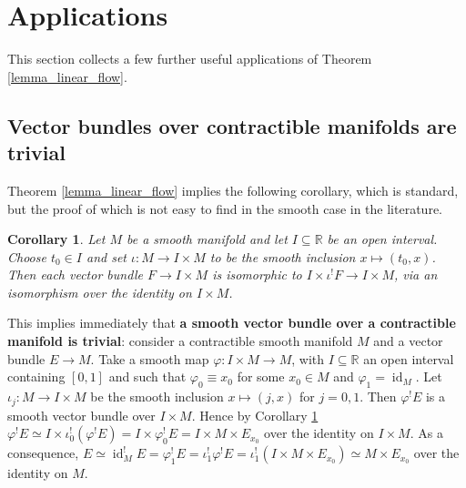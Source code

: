 \documentclass{amsart}
\theoremstyle{plain}
\newtheorem{corollary}[theorem]{Corollary}
\DeclareMathOperator {\id}    {id}
\begin{document}
\section{Applications}
This section collects a few further  useful applications of Theorem \ref{lemma_linear_flow}.
\subsection{Vector bundles over contractible manifolds are trivial}
Theorem \ref{lemma_linear_flow} implies  the following corollary, which is standard, but the proof of which is not easy to find in the smooth case in the literature. 
\begin{corollary}\label{cor_standard_vb_over_int}
Let $M$ be a smooth manifold and let $I\subseteq \mathbb R$ be an open interval. Choose $t_0\in I$ and set $\iota\colon M\to I\times M$ to be the smooth inclusion $x\mapsto (t_0,x)$. Then 
each vector bundle $F\to I\times M$ is isomorphic to $I\times \iota^!F\to I\times M$, via an isomorphism over the identity on $I\times M$.
\end{corollary}
This implies immediately that \textbf{a smooth vector bundle over a contractible manifold is trivial}: consider a contractible smooth manifold $M$ and a vector bundle $E\to M$. Take a smooth map $\varphi\colon I\times M\to M$, with $I\subseteq \mathbb R$ an open interval containing $[0,1]$ and such that $\varphi_0\equiv x_0$ for some $x_0\in M$ and $\varphi_1=\id_M$. Let $\iota_j\colon M\to I\times M$ be the smooth inclusion $x\mapsto (j,x)$ for $j=0,1$. Then $\varphi^! E$ is a smooth vector bundle over $I\times M$. Hence by Corollary \ref{cor_standard_vb_over_int} $\varphi^!E\simeq I\times \iota_0^!(\varphi^!E)=I\times \varphi_0^!E=I\times M\times  E_{x_0}$ over the identity on $I\times M$. As a consequence, $E\simeq \id_M^!E=\varphi_1^!E=\iota_1^!\varphi^!E=\iota_1^!(I\times M\times  E_{x_0})\simeq M\times E_{x_0}$ over the identity on $M$.
\end{document}
